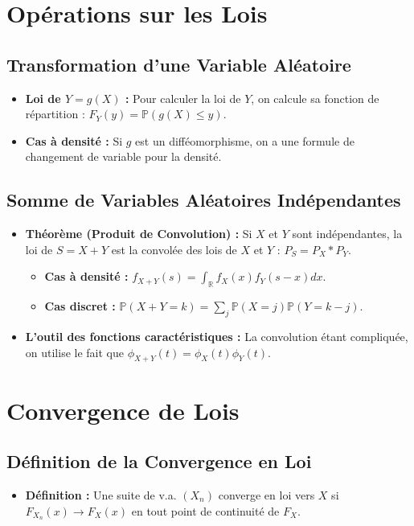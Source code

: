 \documentclass[12pt, a4paper, parskip=full]{report}
\theoremstyle{agregstyle}
\begin{document}
\section{Opérations sur les Lois}
\subsection{Transformation d'une Variable Aléatoire}
\begin{itemize}
    \item \textbf{Loi de $Y=g(X)$ :} Pour calculer la loi de $Y$, on calcule sa fonction de répartition : $F_Y(y) = \mathbb{P}(g(X) \le y)$.
    \item \textbf{Cas à densité :} Si $g$ est un difféomorphisme, on a une formule de changement de variable pour la densité.
\end{itemize}
\subsection{Somme de Variables Aléatoires Indépendantes}
\begin{itemize}
    \item \textbf{Théorème (Produit de Convolution) :} Si $X$ et $Y$ sont indépendantes, la loi de $S=X+Y$ est la convolée des lois de $X$ et $Y$ : $P_S = P_X * P_Y$.
        \begin{itemize}
            \item \textbf{Cas à densité :} $f_{X+Y}(s) = \int_\mathbb{R} f_X(x)f_Y(s-x)dx$.
            \item \textbf{Cas discret :} $\mathbb{P}(X+Y=k) = \sum_j \mathbb{P}(X=j)\mathbb{P}(Y=k-j)$.
        \end{itemize}
    \item \textbf{L'outil des fonctions caractéristiques :} La convolution étant compliquée, on utilise le fait que $\phi_{X+Y}(t) = \phi_X(t) \phi_Y(t)$.
\end{itemize}

\section{Convergence de Lois}
\subsection{Définition de la Convergence en Loi}
\begin{itemize}
    \item \textbf{Définition :} Une suite de v.a. $(X_n)$ converge en loi vers $X$ si $F_{X_n}(x) \to F_X(x)$ en tout point de continuité de $F_X$.
\end{itemize}
\end{document}
